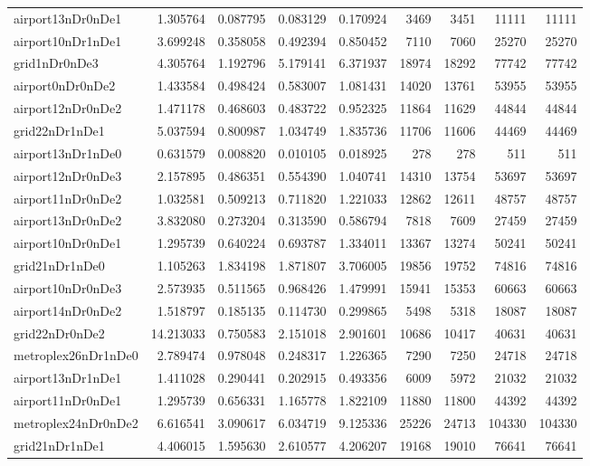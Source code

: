 \begin{longtable}{|l|r|r|r|r|r|r|r|r|}
airport13nDr0nDe1 & 1.305764 & 0.087795 & 0.083129 & 0.170924 & 3469 & 3451 & 11111 & 11111 \\
airport10nDr1nDe1 & 3.699248 & 0.358058 & 0.492394 & 0.850452 & 7110 & 7060 & 25270 & 25270 \\
grid1nDr0nDe3 & 4.305764 & 1.192796 & 5.179141 & 6.371937 & 18974 & 18292 & 77742 & 77742 \\
airport0nDr0nDe2 & 1.433584 & 0.498424 & 0.583007 & 1.081431 & 14020 & 13761 & 53955 & 53955 \\
airport12nDr0nDe2 & 1.471178 & 0.468603 & 0.483722 & 0.952325 & 11864 & 11629 & 44844 & 44844 \\
grid22nDr1nDe1 & 5.037594 & 0.800987 & 1.034749 & 1.835736 & 11706 & 11606 & 44469 & 44469 \\
airport13nDr1nDe0 & 0.631579 & 0.008820 & 0.010105 & 0.018925 & 278 & 278 & 511 & 511 \\
airport12nDr0nDe3 & 2.157895 & 0.486351 & 0.554390 & 1.040741 & 14310 & 13754 & 53697 & 53697 \\
airport11nDr0nDe2 & 1.032581 & 0.509213 & 0.711820 & 1.221033 & 12862 & 12611 & 48757 & 48757 \\
airport13nDr0nDe2 & 3.832080 & 0.273204 & 0.313590 & 0.586794 & 7818 & 7609 & 27459 & 27459 \\
airport10nDr0nDe1 & 1.295739 & 0.640224 & 0.693787 & 1.334011 & 13367 & 13274 & 50241 & 50241 \\
grid21nDr1nDe0 & 1.105263 & 1.834198 & 1.871807 & 3.706005 & 19856 & 19752 & 74816 & 74816 \\
airport10nDr0nDe3 & 2.573935 & 0.511565 & 0.968426 & 1.479991 & 15941 & 15353 & 60663 & 60663 \\
airport14nDr0nDe2 & 1.518797 & 0.185135 & 0.114730 & 0.299865 & 5498 & 5318 & 18087 & 18087 \\
grid22nDr0nDe2 & 14.213033 & 0.750583 & 2.151018 & 2.901601 & 10686 & 10417 & 40631 & 40631 \\
metroplex26nDr1nDe0 & 2.789474 & 0.978048 & 0.248317 & 1.226365 & 7290 & 7250 & 24718 & 24718 \\
airport13nDr1nDe1 & 1.411028 & 0.290441 & 0.202915 & 0.493356 & 6009 & 5972 & 21032 & 21032 \\
airport11nDr0nDe1 & 1.295739 & 0.656331 & 1.165778 & 1.822109 & 11880 & 11800 & 44392 & 44392 \\
metroplex24nDr0nDe2 & 6.616541 & 3.090617 & 6.034719 & 9.125336 & 25226 & 24713 & 104330 & 104330 \\
grid21nDr1nDe1 & 4.406015 & 1.595630 & 2.610577 & 4.206207 & 19168 & 19010 & 76641 & 76641 \\

\end{longtable}
